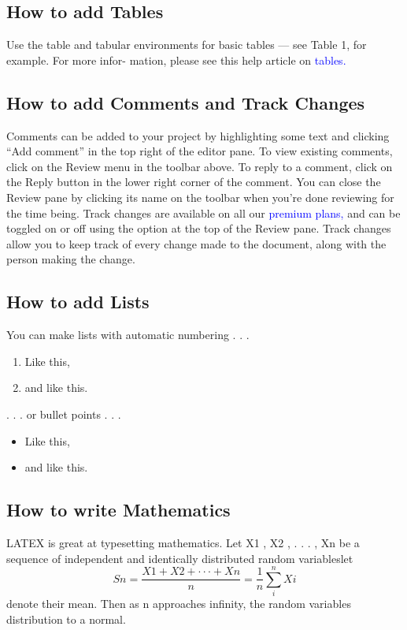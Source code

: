 \documentclass{article}
\begin{document}
	\subsection{How to add Tables}
	Use the table and tabular environments for basic tables — see Table 1, for example. For more infor-
	mation, please see this help article on \textcolor{blue}{tables.}
	\subsection{How to add Comments and Track Changes}
	Comments can be added to your project by highlighting some text and clicking “Add comment” in
	the top right of the editor pane. To view existing comments, click on the Review menu in the toolbar
	above. To reply to a comment, click on the Reply button in the lower right corner of the comment.
	You can close the Review pane by clicking its name on the toolbar when you’re done reviewing for the
	time being.
	Track changes are available on all our \textcolor{blue}{premium plans,} and can be toggled on or off using the option
	at the top of the Review pane. Track changes allow you to keep track of every change made to the
	document, along with the person making the change.
	\subsection{How to add Lists}
	You can make lists with automatic numbering . . .
	\begin{enumerate}
		\item Like this,
		\item and like this.
	\end{enumerate}
		. . . or bullet points . . .
	\begin{itemize}
		\item Like this,
		\item and like this.
	\end{itemize}
	\subsection{How to write Mathematics}
	LATEX is great at typesetting mathematics. Let X1 , X2 , . . . , Xn be a sequence of independent and
	identically distributed random variableslet
	\begin{equation}
	Sn=\frac{X1 + X2 + · · · + Xn}{n}=\frac{1}{n}\sum_{i}^{n}Xi
	\end{equation}
	denote their mean. Then as n approaches infinity, the random variables
	distribution to a normal.
\end{document}
